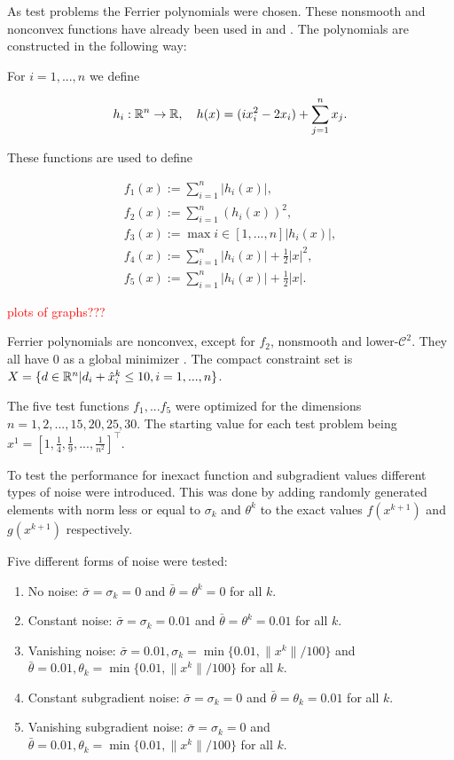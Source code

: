 As test problems the Ferrier polynomials were chosen. These nonsmooth and nonconvex functions have already been used in \cite{Hare2010} and \cite{Hare2016}. The polynomials are constructed in the following way:

For \(i = 1,...,n\) we define 

\begin{align*}
	h_i: \mathbb{R}^n \to \mathbb{R}, \quad h(x) = (ix_i^2-2x_i)+\sum_{j=1}^n x_j.
\end{align*}

These functions are used to define

\begin{align*}
	f_1(x) := \sum_{i=1}^n |h_i(x)|, \\
	f_2(x) := \sum_{i=1}^n (h_i(x))^2, \\
	f_3(x) := \max{i \in [1,...,n]}|h_i(x)|, \\
	f_4(x) := \sum_{i=1}^n |h_i(x)|+\frac{1}{2}|x|^2, \\
	f_5(x) := \sum_{i=1}^n |h_i(x)|+\frac{1}{2}|x|.
\end{align*}

\textcolor{red}{plots of graphs???}

Ferrier polynomials are nonconvex, except for \(f_2\), nonsmooth and lower-\(\mathcal{C}^2\). They all have \(0\) as a global minimizer \cite{Hare2010}. The compact constraint set is \(X=\{d \in \mathbb{R}^n|d_i+\hat{x}^k_i \leq 10, i = 1,...,n \}\).

The five test functions \(f_1,...f_5\) were optimized for the dimensions \(n=1,2,...,15,20,25,30\).
The starting value for each test problem being \(x^1=[1,\frac{1}{4},\frac{1}{9},...,\frac{1}{n^2}]^{\top}\).

To test the performance for inexact function and subgradient values different types of noise were introduced. This was done by adding randomly generated elements with norm less or equal to \(\sigma_k\) and \(\theta^k\) to the exact values \(f(x^{k+1})\) and \(g(x^{k+1})\) respectively.

Five different forms of noise were tested:

\begin{enumerate}[--]
	\item No noise: \(\bar{\sigma}=\sigma_k=0\) and \(\bar{\theta}=\theta^k=0\) for all \(k\).
	\item Constant noise: \(\bar{\sigma}=\sigma_k=0.01\) and \(\bar{\theta}=\theta^k=0.01\) for all \(k\).
	\item Vanishing noise: \(\bar{\sigma}=0.01, \sigma_k = \min\{0.01,\|x^k\|/100\}\) and \(\bar{\theta}=0.01, \theta_k=\min\{0.01,\|x^k\|/100\}\) for all \(k\).
	\item Constant subgradient noise: \(\bar{\sigma}=\sigma_k=0\) and \(\bar{\theta}=\theta_k=0.01\) for all \(k\).
	\item Vanishing subgradient noise: \(\bar{\sigma}=\sigma_k=0\) and \(\bar{\theta}=0.01, \theta_k=\min\{0.01,\|x^k\|/100\}\) for all \(k\).
\end{enumerate}

